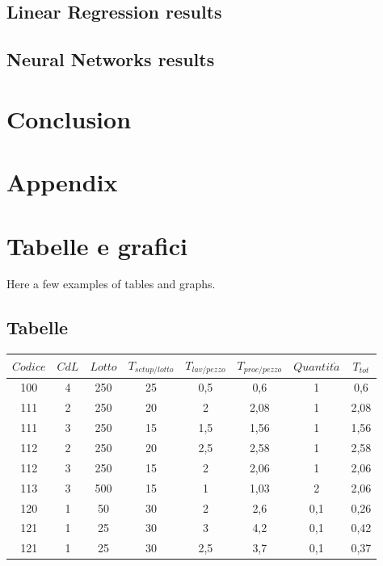 \documentclass{FR16}
\begin{document}
\subsection{Linear Regression results}
\subsection{Neural Networks results}
\newpage
\section{Conclusion}
\newpage

\section{Appendix}

\newpage

\section{Tabelle e grafici}
Here a few examples of tables and graphs.
\subsection{Tabelle}
\begin{center}
\begin{tabular}{c c c c c c c c}
\arrayrulecolor{Azzurro}
\hline
{\bfseries $Codice$} & {\bfseries $CdL$} & {\bfseries $Lotto$} & {\bfseries $T_{setup/lotto}$} & {\bfseries $T_{lav/pezzo}$} & {\bfseries $T_{proc/pezzo}$} & {\bfseries$Quantit\grave{a}$} & {\bfseries $T_{tot}$}\\
\hline
100 & 4 & 250 & 25 & 0,5 & 0,6 & 1 & 0,6\\
111 & 2 & 250 & 20 & 2 & 2,08 & 1 & 2,08 \\
111 & 3 & 250 & 15 & 1,5 & 1,56 & 1 & 1,56 \\
112 & 2 & 250 & 20 & 2,5 & 2,58 & 1 & 2,58 \\
112 & 3 & 250 & 15 & 2 & 2,06 & 1 & 2,06\\
113 & 3 & 500 & 15 & 1 & 1,03 & 2 & 2,06\\
120 & 1 & 50 & 30 & 2 & 2,6 & 0,1 & 0,26\\
121 & 1 & 25 & 30 & 3 & 4,2 & 0,1 & 0,42 \\
121 & 1 & 25 & 30 & 2,5 & 3,7 & 0,1 & 0,37 \\
\hline
\end{tabular}
\end{center}
\end{document}
